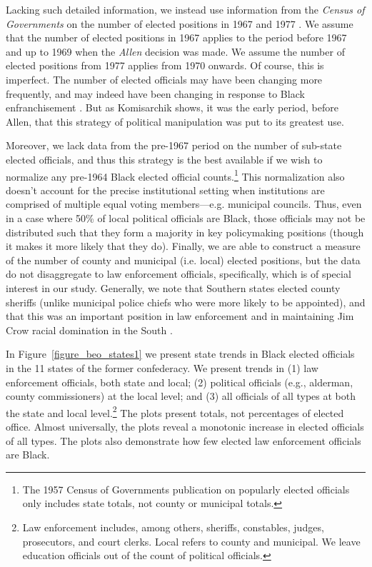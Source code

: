 \documentclass[12pt]{article}
\begin{document}
Lacking such detailed information, we instead use information from the \emph{Census of Governments} on the number of elected positions in 1967 and 1977 .  We assume that the number of elected positions in 1967 applies to the period before 1967 and up to 1969 when the \emph{Allen} decision was made.  We assume the number of elected positions from 1977 applies from 1970 onwards.  Of course, this is imperfect.  The number of elected officials may have been changing more frequently, and may indeed have been changing in response to Black enfranchisement .  But as Komisarchik shows, it was the early period, before Allen, that this strategy of political manipulation was put to its greatest use.

Moreover, we lack data from the pre-1967 period on the number of sub-state elected officials, and thus this strategy is the best available if we wish to normalize any pre-1964 Black elected official counts.\footnote{The 1957 Census of Governments publication on popularly elected officials only includes state totals, not county or municipal totals.}  This normalization also doesn't account for the precise institutional setting when institutions are comprised of multiple equal voting members---e.g. municipal councils.  Thus, even in a case where 50\% of local political officials are Black, those officials may not be distributed such that they form a majority in key policymaking positions (though it makes it more likely that they do). Finally, we are able to construct a measure of the number of county and municipal (i.e. local) elected positions, but the data do not disaggregate to law enforcement officials, specifically, which is of special interest in our study.  Generally, we note that Southern states elected county sheriffs (unlike municipal police chiefs who were more likely to be appointed), and that this was an important position in law enforcement and in maintaining Jim Crow racial domination in the South .


In Figure~\ref{figure_beo_states1} we present state trends in Black elected officials in the 11 states of the former confederacy.  We present trends in (1) law enforcement officials, both state and local; (2) political officials (e.g., alderman, county commissioners) at the local level; and (3) all officials of all types at both the state and local level.\footnote{Law enforcement includes, among others, sheriffs, constables, judges, prosecutors, and court clerks.  Local refers to county and municipal.  We leave education officials out of the count of political officials.}  The plots present totals, not percentages of elected office.  Almost universally, the plots reveal a monotonic increase in elected officials of all types.  The plots also demonstrate how few elected law enforcement officials are Black.
\end{document}
